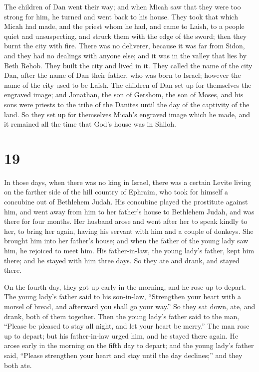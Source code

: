  The children of Dan went their way; and when Micah saw
that they were too strong for him, he turned and went back to his house.
 They took that which Micah had made, and the priest whom
he had, and came to Laish, to a people quiet and unsuspecting, and
struck them with the edge of the sword; then they burnt the city with
fire.  There was no deliverer, because it was far from
Sidon, and they had no dealings with anyone else; and it was in the
valley that lies by Beth Rehob. They built the city and lived in it.
 They called the name of the city Dan, after the name of
Dan their father, who was born to Israel; however the name of the city
used to be Laish.  The children of Dan set up for
themselves the engraved image; and Jonathan, the son of Gershom, the son
of Moses, and his sons were priests to the tribe of the Danites until
the day of the captivity of the land.  So they set up for
themselves Micah's engraved image which he made, and it remained all the
time that God's house was in Shiloh.

\hypertarget{section-18}{%
\section{19}\label{section-18}}

 In those days, when there was no king in Israel, there was
a certain Levite living on the farther side of the hill country of
Ephraim, who took for himself a concubine out of Bethlehem Judah.
 His concubine played the prostitute against him, and went
away from him to her father's house to Bethlehem Judah, and was there
for four months.  Her husband arose and went after her to
speak kindly to her, to bring her again, having his servant with him and
a couple of donkeys. She brought him into her father's house; and when
the father of the young lady saw him, he rejoiced to meet him.
 His father-in-law, the young lady's father, kept him there;
and he stayed with him three days. So they ate and drank, and stayed
there.

 On the fourth day, they got up early in the morning, and he
rose up to depart. The young lady's father said to his son-in-law,
``Strengthen your heart with a morsel of bread, and afterward you shall
go your way.''  So they sat down, ate, and drank, both of
them together. Then the young lady's father said to the man, ``Please be
pleased to stay all night, and let your heart be merry.'' 
The man rose up to depart; but his father-in-law urged him, and he
stayed there again.  He arose early in the morning on the
fifth day to depart; and the young lady's father said, ``Please
strengthen your heart and stay until the day declines;'' and they both
ate.


